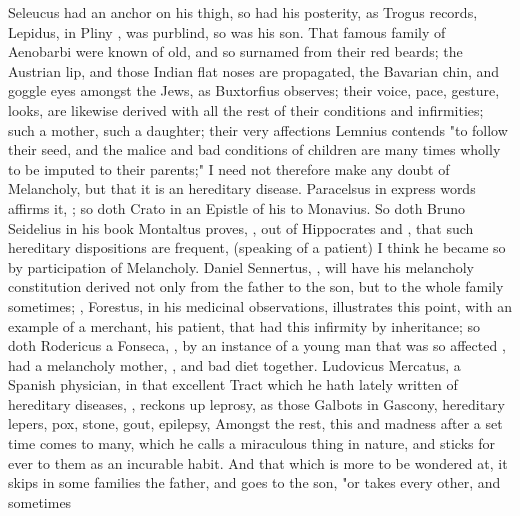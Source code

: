 Seleucus had an anchor on his thigh, so had his posterity, as Trogus records,
 Lepidus, in Pliny , was purblind, so was his son. That famous family of Aenobarbi were known
of old, and so surnamed from their red beards; the Austrian lip, and those
Indian flat noses are propagated, the Bavarian chin, and goggle eyes amongst
the Jews, as Buxtorfius observes; their voice, pace,
gesture, looks, are likewise derived with all the rest of their conditions and
infirmities; such a mother, such a daughter; their very
affections Lemnius contends "to follow their seed, and the
malice and bad conditions of children are many times wholly to be imputed to
their parents;" I need not therefore make any doubt of Melancholy, but that it
is an hereditary disease. Paracelsus in express words
affirms it, ; so doth
Crato in an Epistle of his to Monavius. So doth Bruno
Seidelius in his book  Montaltus
proves, , out of Hippocrates and \Plutarch{}, that
such hereditary dispositions are frequent,  (speaking of a patient) I think he
became so by participation of Melancholy. Daniel Sennertus,
, will have his melancholy
constitution derived not only from the father to the son, but to the whole
family sometimes; ,
Forestus, in his medicinal observations, illustrates this
point, with an example of a merchant, his patient, that had this infirmity by
inheritance; so doth Rodericus a Fonseca, , by an instance of a young man that was so affected , had a melancholy mother, , and bad
diet together. Ludovicus Mercatus, a Spanish physician, in that excellent Tract
which he hath lately written of hereditary diseases, , reckons up leprosy, as those Galbots in
Gascony, hereditary lepers, pox, stone, gout, epilepsy, \etc{} Amongst the
rest, this and madness after a set time comes to many, which he calls a
miraculous thing in nature, and sticks for ever to them as an incurable habit.
And that which is more to be wondered at, it skips in some families the father,
and goes to the son, "or takes every other, and sometimes

